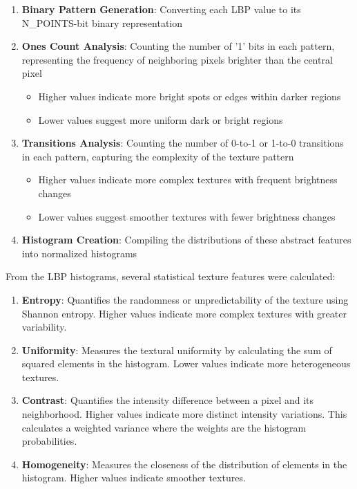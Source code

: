 \documentclass[a4paper,12pt]{report}
\begin{document}
\begin{enumerate}
    \item \textbf{Binary Pattern Generation}: Converting each LBP value to its N\_POINTS-bit binary representation
    \item \textbf{Ones Count Analysis}: Counting the number of '1' bits in each pattern, representing the frequency of neighboring pixels brighter than the central pixel
    \begin{itemize}
        \item Higher values indicate more bright spots or edges within darker regions
        \item Lower values suggest more uniform dark or bright regions
    \end{itemize}
    \item \textbf{Transitions Analysis}: Counting the number of 0-to-1 or 1-to-0 transitions in each pattern, capturing the complexity of the texture pattern
    \begin{itemize}
        \item Higher values indicate more complex textures with frequent brightness changes
        \item Lower values suggest smoother textures with fewer brightness changes
    \end{itemize}
    \item \textbf{Histogram Creation}: Compiling the distributions of these abstract features into normalized histograms
\end{enumerate}


From the LBP histograms, several statistical texture features were calculated:

\begin{enumerate}
    \item \textbf{Entropy}: Quantifies the randomness or unpredictability of the texture using Shannon entropy. Higher values indicate more complex textures with greater variability.

    \item \textbf{Uniformity}: Measures the textural uniformity by calculating the sum of squared elements in the histogram. Lower values indicate more heterogeneous textures.

    \item \textbf{Contrast}: Quantifies the intensity difference between a pixel and its neighborhood. Higher values indicate more distinct intensity variations. This calculates a weighted variance where the weights are the histogram probabilities.

    \item \textbf{Homogeneity}: Measures the closeness of the distribution of elements in the histogram. Higher values indicate smoother textures.
\end{enumerate}
\end{document}
